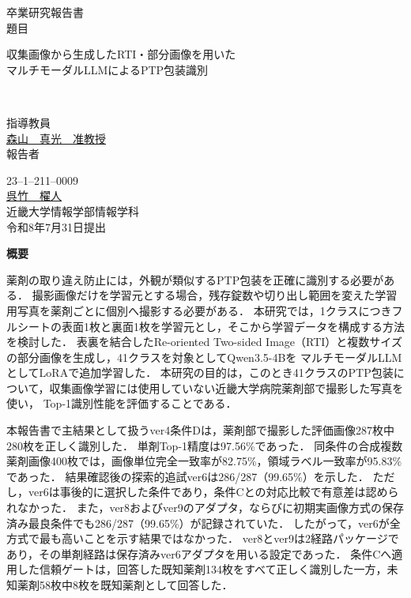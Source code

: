 \documentclass[uplatex,dvipdfmx]{jsarticle}
\begin{document}
\pagestyle{empty}

\begin{center}
\vspace*{1cm}
\large
{\LARGE 卒業研究報告書}\\
\vspace*{0.8cm}
題目\\
\vspace*{1cm}
\parbox{15.5cm}{\centering\LARGE
収集画像から生成したRTI・部分画像を用いた\\[2mm]
マルチモーダルLLMによるPTP包装識別}\\
\vspace{3mm}

\vspace*{3cm}
指導教員\\
\vspace*{0.3cm}
\underline{\LARGE 森山　真光　准教授}\\
\vspace*{3cm}
報告者\\
\vspace*{0.3cm}

{23--1--211--0009}\\
\vspace*{0.3cm}
\underline{\Huge 呉竹　櫂人}\\
\vspace*{0.5cm}
近畿大学情報学部情報学科\\
\vspace*{2cm}
令和8年7月31日提出\\
\end{center}

\newpage
\normalsize

\clearpage
\begin{center}
{\bf \Large 概要}
\end{center}

薬剤の取り違え防止には，外観が類似するPTP包装を正確に識別する必要がある．
撮影画像だけを学習元とする場合，残存錠数や切り出し範囲を変えた学習用写真を薬剤ごとに個別へ撮影する必要がある．
本研究では，1クラスにつきフルシートの表面1枚と裏面1枚を学習元とし，そこから学習データを構成する方法を検討した．
表裏を結合したRe-oriented Two-sided Image（RTI）と複数サイズの部分画像を生成し，41クラスを対象としてQwen3.5-4Bを
マルチモーダルLLMとしてLoRAで追加学習した．
本研究の目的は，このとき41クラスのPTP包装について，収集画像学習には使用していない近畿大学病院薬剤部で撮影した写真を使い，
Top-1識別性能を評価することである．

本報告書で主結果として扱うver4条件Dは，薬剤部で撮影した評価画像287枚中280枚を正しく識別した．
単剤Top-1精度は97.56\%であった．
同条件の合成複数薬剤画像400枚では，画像単位完全一致率が82.75\%，領域ラベル一致率が95.83\%であった．
結果確認後の探索的追試ver6は286/287（99.65\%）を示した．
ただし，ver6は事後的に選択した条件であり，条件Cとの対応比較で有意差は認められなかった．
また，ver8およびver9のアダプタ，ならびに初期実画像方式の保存済み最良条件でも286/287（99.65\%）が記録されていた．
したがって，ver6が全方式で最も高いことを示す結果ではなかった．
ver8とver9は2経路パッケージであり，その単剤経路は保存済みver6アダプタを用いる設定であった．
条件Cへ適用した信頼ゲートは，回答した既知薬剤134枚をすべて正しく識別した一方，未知薬剤58枚中8枚を既知薬剤として回答した．
\end{document}
